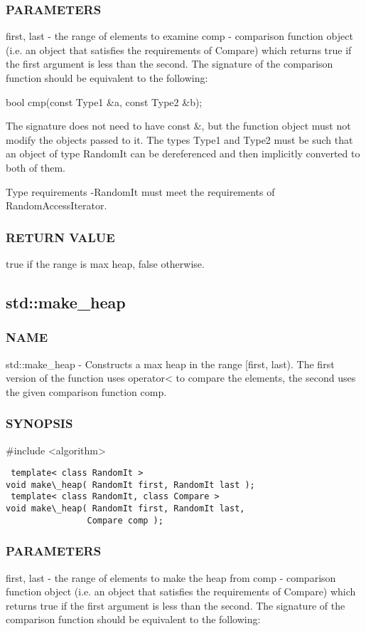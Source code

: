 \subsubsection{PARAMETERS}
first, last - the range of elements to examine
comp - comparison function object (i.e. an object that satisfies the requirements of Compare) which returns true if the first argument is less than the second.
The signature of the comparison function should be equivalent to the following:

 bool cmp(const Type1 \&a, const Type2 \&b);

The signature does not need to have const \&, but the function object must not modify the objects passed to it.
The types Type1 and Type2 must be such that an object of type RandomIt can be dereferenced and then implicitly converted to both of them.

 Type requirements
 -RandomIt must meet the requirements of RandomAccessIterator.

\subsubsection{RETURN VALUE}
true if the range is max heap, false otherwise.



\subsection{std::make\_heap}

\subsubsection{NAME}
std::make\_heap - Constructs a max heap in the range [first, last). The first version of the function uses operator< to compare the elements, the second uses the given comparison function comp.

\subsubsection{SYNOPSIS}
\#include <algorithm>

\begin{lstlisting}
 template< class RandomIt >
void make\_heap( RandomIt first, RandomIt last );
 template< class RandomIt, class Compare >
void make\_heap( RandomIt first, RandomIt last,
                Compare comp );
\end{lstlisting}

\subsubsection{PARAMETERS}
first, last - the range of elements to make the heap from
comp - comparison function object (i.e. an object that satisfies the requirements of Compare) which returns true if the first argument is less than the second.
The signature of the comparison function should be equivalent to the following:


